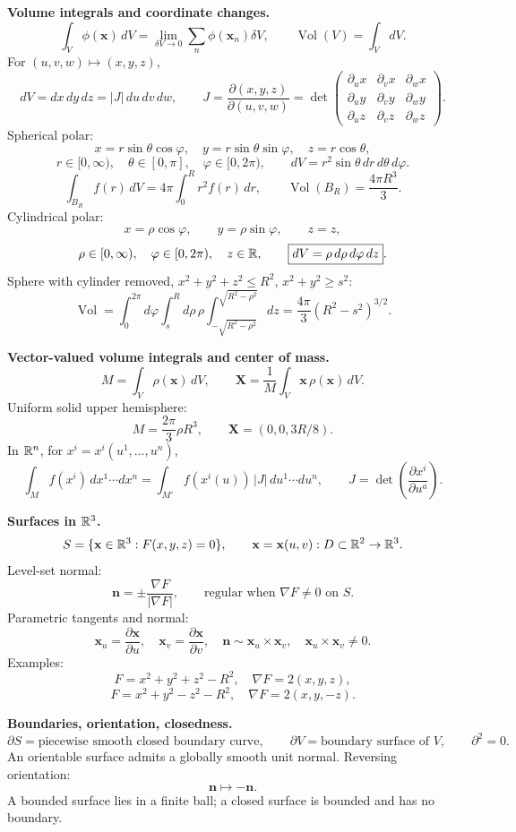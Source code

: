 \noindent\textbf{Volume integrals and coordinate changes.}
\[
\int_V\phi(\mathbf{x})\,dV
=\lim_{\delta V\to0}\sum_n\phi(\mathbf{x}_n)\delta V,
\qquad
\operatorname{Vol}(V)=\int_V dV.
\]
For $(u,v,w)\mapsto(x,y,z)$,
\[
\boxed{dV=dx\,dy\,dz=|J|\,du\,dv\,dw},
\qquad
J=\frac{\partial(x,y,z)}{\partial(u,v,w)}
=\det\begin{pmatrix}
\partial_u x & \partial_v x & \partial_w x\\
\partial_u y & \partial_v y & \partial_w y\\
\partial_u z & \partial_v z & \partial_w z
\end{pmatrix}.
\]
Spherical polar:
\[
x=r\sin\theta\cos\varphi,\quad
y=r\sin\theta\sin\varphi,\quad
z=r\cos\theta,
\]
\[
r\in[0,\infty),\quad\theta\in[0,\pi],\quad\varphi\in[0,2\pi),
\qquad
\boxed{dV=r^2\sin\theta\,dr\,d\theta\,d\varphi}.
\]
\[
\int_{B_R} f(r)\,dV=4\pi\int_0^R r^2f(r)\,dr,
\qquad
\operatorname{Vol}(B_R)=\frac{4\pi R^3}{3}.
\]
Cylindrical polar:
\[
x=\rho\cos\varphi,\qquad y=\rho\sin\varphi,\qquad z=z,
\]
\[
\rho\in[0,\infty),\quad \varphi\in[0,2\pi),\quad z\in\mathbb{R},
\qquad
\boxed{dV=\rho\,d\rho\,d\varphi\,dz}.
\]
Sphere with cylinder removed, $x^2+y^2+z^2\le R^2$, $x^2+y^2\ge s^2$:
\[
\operatorname{Vol}
=\int_0^{2\pi}d\varphi\int_s^R d\rho\,\rho
\int_{-\sqrt{R^2-\rho^2}}^{\sqrt{R^2-\rho^2}}dz
=\boxed{\frac{4\pi}{3}(R^2-s^2)^{3/2}}.
\]

\noindent\textbf{Vector-valued volume integrals and center of mass.}
\[
M=\int_V\rho(\mathbf{x})\,dV,\qquad
\mathbf{X}=\frac{1}{M}\int_V\mathbf{x}\,\rho(\mathbf{x})\,dV.
\]
Uniform solid upper hemisphere:
\[
M=\frac{2\pi}{3}\rho R^3,\qquad \mathbf{X}=(0,0,3R/8).
\]
In $\mathbb{R}^n$, for $x^i=x^i(u^1,\ldots,u^n)$,
\[
\int_M f(x^i)\,dx^1\cdots dx^n
=\int_{M'}f(x^i(u))\,|J|\,du^1\cdots du^n,
\qquad
J=\det\left(\frac{\partial x^i}{\partial u^a}\right).
\]

\noindent\textbf{Surfaces in \texorpdfstring{$\mathbb{R}^3$}{R3}.}
\[
S=\{\mathbf{x}\in\mathbb{R}^3:F(x,y,z)=0\},
\qquad
\mathbf{x}=\mathbf{x}(u,v):D\subset\mathbb{R}^2\to\mathbb{R}^3.
\]
Level-set normal:
\[
\mathbf{n}=\pm\frac{\nabla F}{|\nabla F|},\qquad
\text{regular when }\nabla F\ne0\text{ on }S.
\]
Parametric tangents and normal:
\[
\mathbf{x}_u=\frac{\partial\mathbf{x}}{\partial u},\quad
\mathbf{x}_v=\frac{\partial\mathbf{x}}{\partial v},\quad
\mathbf{n}\sim\mathbf{x}_u\times\mathbf{x}_v,\quad
\mathbf{x}_u\times\mathbf{x}_v\ne0.
\]
Examples:
\[
F=x^2+y^2+z^2-R^2,\quad \nabla F=2(x,y,z),
\]
\[
F=x^2+y^2-z^2-R^2,\quad \nabla F=2(x,y,-z).
\]

\noindent\textbf{Boundaries, orientation, closedness.}
\[
\partial S=\text{piecewise smooth closed boundary curve},\qquad
\partial V=\text{boundary surface of }V,\qquad
\boxed{\partial^2=0}.
\]
An orientable surface admits a globally smooth unit normal. Reversing orientation:
\[
\mathbf{n}\mapsto-\mathbf{n}.
\]
A bounded surface lies in a finite ball; a closed surface is bounded and has no boundary.

